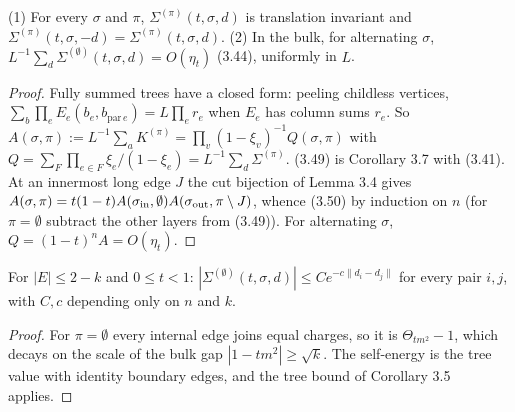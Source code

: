 \begin{lemma}\label{lem:3.10}
  \leanok
  (1) For every $\sigma$ and $\pi$, $\Sigma^{(\pi)}(t,\sigma,d)$ is translation invariant and
  $\Sigma^{(\pi)}(t,\sigma,-d)=\Sigma^{(\pi)}(t,\sigma,d)$.  (2) In the bulk, for alternating
  $\sigma$, $L^{-1}\sum_d\Sigma^{(\emptyset)}(t,\sigma,d)=O(\eta_t)$ (3.44), uniformly in $L$.
\end{lemma}
\begin{proof}\leanok{}
  Fully summed trees have a closed form: peeling childless vertices,
  $\sum_b\prod_eE_e(b_e,b_{\mathrm{par}\,e})=L\prod_er_e$ when $E_e$ has column sums $r_e$.  So
  $A(\sigma,\pi):=L^{-1}\sum_aK^{(\pi)}=\prod_v(1-\xi_v)^{-1}Q(\sigma,\pi)$ with
  $Q=\sum_{F}\prod_{e\in F}\xi_e/(1-\xi_e)=L^{-1}\sum_d\Sigma^{(\pi)}$.  (3.49) is Corollary 3.7
  with (3.41).  At an innermost long edge $J$ the cut bijection of Lemma 3.4 gives
  $A(\sigma,\pi)=t(1-t)A(\sigma_{\rm in},\emptyset)A(\sigma_{\rm out},\pi\setminus J)$, whence
  (3.50) by induction on $n$ (for $\pi=\emptyset$ subtract the other layers from (3.49)).  For
  alternating $\sigma$, $Q=(1-t)^nA=O(\eta_t)$.
\end{proof}

\begin{lemma}\label{eq:3.43}
  \leanok{}
  For $|E|\le2-k$ and $0\le t<1$: $|\Sigma^{(\emptyset)}(t,\sigma,d)|\le C e^{-c\|d_i-d_j\|}$ for
  every pair $i,j$, with $C,c$ depending only on $n$ and $k$.
\end{lemma}
\begin{proof}\leanok{}
  For $\pi=\emptyset$ every internal edge joins equal charges, so it is $\Theta_{tm^2}-1$, which
  decays on the scale of the bulk gap $|1-tm^2|\ge\sqrt k$.  The self-energy is the tree value
  with identity boundary edges, and the tree bound of Corollary 3.5 applies.
\end{proof}

